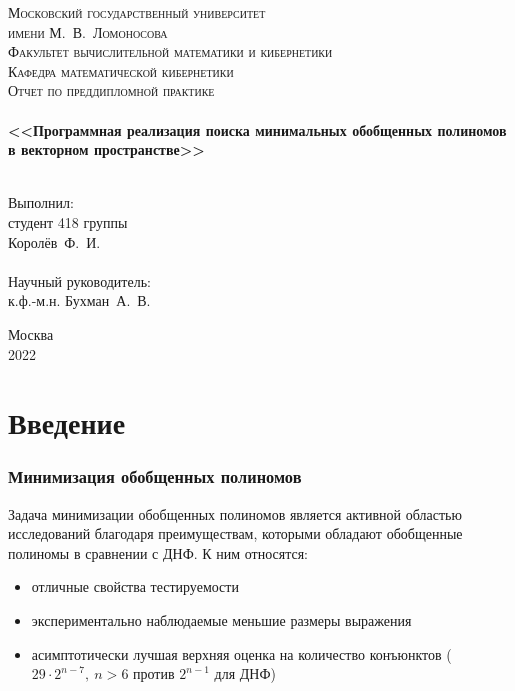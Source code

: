 \documentclass[a4paper,12pt,titlepage,finall]{article}
\begin{document}
\begin{titlepage}
    \begin{center}
    \textsc{\small Московский государственный университет \\имени М.~В.~Ломоносова\\
    Факультет вычислительной математики и кибернетики\\Кафедра математической кибернетики\\}
    \vfill
    \textsc{\Large Отчет по преддипломной практике}\\
    ~\\
    \textbf{\large <<Программная реализация поиска минимальных обобщенных полиномов в векторном пространстве>>}\\
    ~\\
    \end{center}
    \begin{flushright}
    \vfill {Выполнил:\\
    студент 418 группы\\
    Королёв~Ф.~И.\\
    ~\\
    Научный руководитель:\\
    к.ф.-м.н. Бухман~А.~В.}
    \end{flushright}
    \begin{center}
    \vfill
    {\small Москва\\2022}
    \end{center}
\end{titlepage}

\tableofcontents
\newpage

\section{Введение}

\subsubsection*{Минимизация обобщенных полиномов}

Задача минимизации обобщенных полиномов является активной областью исследований благодаря преимуществам, которыми обладают обобщенные полиномы в сравнении с ДНФ. К ним относятся:
\begin{itemize}
    \item отличные свойства тестируемости \cite{exorcism4}
    \item экспериментально наблюдаемые меньшие размеры выражения
    \item асимптотически лучшая верхняя оценка на количество конъюнктов ($ 29 \cdot 2^{n - 7}, \ n > 6 $ \cite{bound} против $ 2^{n - 1} $ для ДНФ)
\end{itemize}
\end{document}
